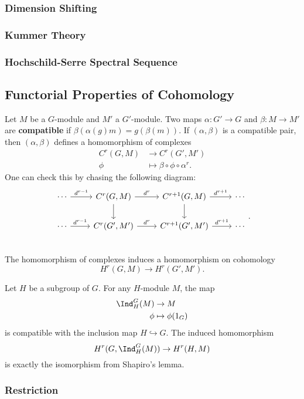 \subsubsection{Dimension Shifting}

\subsubsection{Kummer Theory}

\subsubsection{Hochschild-Serre Spectral Sequence}

\subsection{Functorial Properties of Cohomology}
Let $M$ be a $G$-module and $M'$ a $G'$-module. Two maps $\alpha:G'\to G$ and $\beta:M\to M'$ are \textbf{compatible} if $\beta(\alpha(g)m)=g(\beta(m))$. If $(\alpha,\beta)$ is a compatible pair, then $(\alpha,\beta)$ defines a homomorphism of complexes
\begin{align*}
	C^{r}(G,M)&\to C^{r}(G',M')\\
	\phi&\mapsto\beta\circ\phi\circ\alpha^{r}
.\end{align*}
One can check this by chasing the following diagram:
\[
\begin{tikzcd}
	\cdots\ar{r}{d^{r-1}} & C^{r}(G,M)\ar{r}{d^{r}}\ar[d] & C^{r+1}(G,M)\ar{r}{d^{r+1}}\ar[d] & \cdots\\
	\cdots\ar{r}{d^{r-1}} & C^{r}(G',M')\ar{r}{d^{r}} & C^{r+1}(G',M')\ar{r}{d^{r+1}} & \cdots\\
\end{tikzcd}
.\]
The homomorphism of complexes induces a homomorphism on cohomology
\[
	H^{r}(G,M)\to H^{r}(G',M')
.\]
\begin{example}
Let $H$ be a subgroup of $G$. For any $H$-module $M$, the map
\begin{align*}
	\Ind^{G}_H(M)&\to M\\
	\phi&\mapsto \phi(1_G)
\end{align*}
is compatible with the inclusion map $H\hookrightarrow G$. The induced homomorphism
\[
	H^{r}(G,\Ind^{G}_H(M))\to H^{r}(H,M)
\] 
is exactly the isomorphism from Shapiro's lemma.
\end{example}

\subsubsection{Restriction} 

